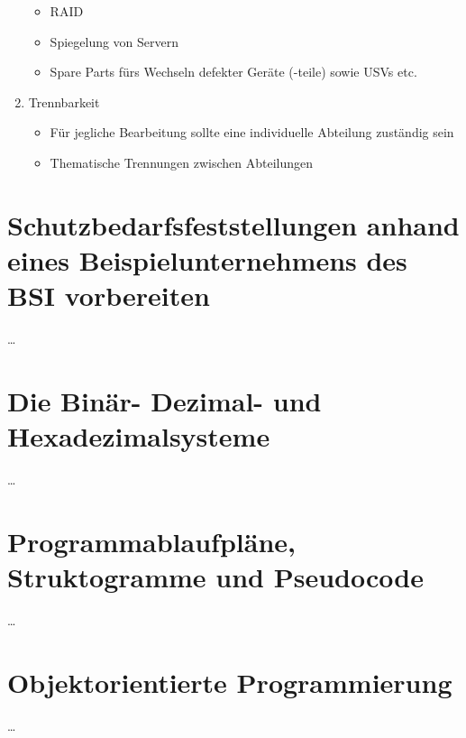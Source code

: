 \documentclass[a4paper, 12pt]{report}
\begin{document}
\begin{multicols}{2}
\begin{enumerate}
\begin{itemize}
			\item RAID
			\item Spiegelung von Servern
			\item Spare Parts fürs Wechseln defekter Geräte (-teile)
				sowie USVs etc.
		\end{itemize}
	\item Trennbarkeit
		\begin{itemize}
			\item Für jegliche Bearbeitung sollte eine individuelle
				Abteilung zuständig sein
			\item Thematische Trennungen zwischen Abteilungen
		\end{itemize}
\end{enumerate}

\section{Schutzbedarfsfeststellungen anhand eines Beispielunternehmens des BSI 
vorbereiten} %
\dots

\section{Die Binär- Dezimal- und Hexadezimalsysteme}
\dots

\section{Programmablaufpläne, Struktogramme und Pseudocode}
\dots

\section{Objektorientierte Programmierung}
\dots
\end{multicols}
\end{document}
